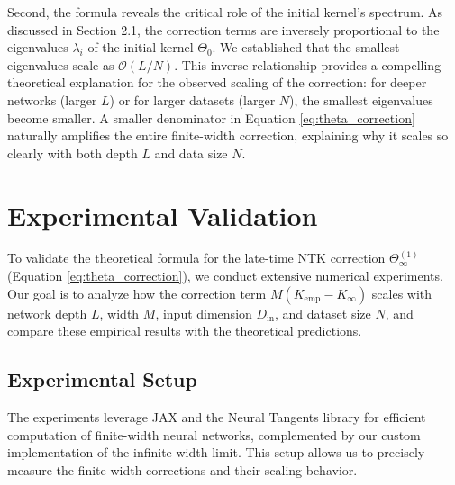 \documentclass{article}
\begin{document}
Second, the formula reveals the critical role of the initial kernel's spectrum. As discussed in Section 2.1, the correction terms are inversely proportional to the eigenvalues $\lambda_i$ of the initial kernel $\Theta_0$. We established that the smallest eigenvalues scale as $\mathcal{O}(L/N)$. This inverse relationship provides a compelling theoretical explanation for the observed scaling of the correction: for deeper networks (larger $L$) or for larger datasets (larger $N$), the smallest eigenvalues become smaller. A smaller denominator in Equation \ref{eq:theta_correction} naturally amplifies the entire finite-width correction, explaining why it scales so clearly with both depth $L$ and data size $N$.

\section{Experimental Validation}

To validate the theoretical formula for the late-time NTK correction $\Theta^{(1)}_\infty$ (Equation \ref{eq:theta_correction}), we conduct extensive numerical experiments. Our goal is to analyze how the correction term $M(K_{\text{emp}} - K_{\infty})$ scales with network depth $L$, width $M$, input dimension $D_{\text{in}}$, and dataset size $N$, and compare these empirical results with the theoretical predictions.

\subsection{Experimental Setup}

The experiments leverage JAX and the Neural Tangents library for efficient computation of finite-width neural networks, complemented by our custom implementation of the infinite-width limit. This setup allows us to precisely measure the finite-width corrections and their scaling behavior.
\end{document}
